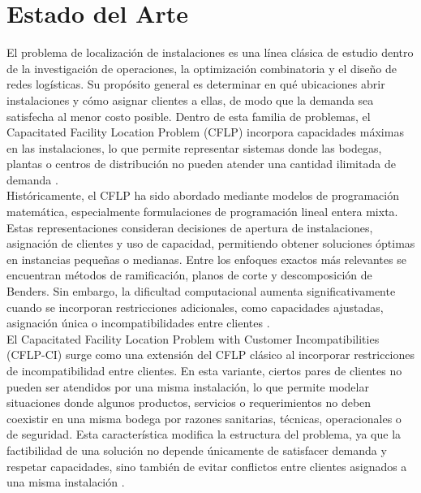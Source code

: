 \section{Estado del Arte}

\noindent El problema de localización de instalaciones es una línea clásica de estudio dentro de la investigación de operaciones, la optimización combinatoria y el diseño de redes logísticas. Su propósito general es determinar en qué ubicaciones abrir instalaciones y cómo asignar clientes a ellas, de modo que la demanda sea satisfecha al menor costo posible. Dentro de esta familia de problemas, el Capacitated Facility Location Problem (CFLP) incorpora capacidades máximas en las instalaciones, lo que permite representar sistemas donde las bodegas, plantas o centros de distribución no pueden atender una cantidad ilimitada de demanda \cite{klose2005facility}.\\

\noindent Históricamente, el CFLP ha sido abordado mediante modelos de programación matemática, especialmente formulaciones de programación lineal entera mixta. Estas representaciones consideran decisiones de apertura de instalaciones, asignación de clientes y uso de capacidad, permitiendo obtener soluciones óptimas en instancias pequeñas o medianas. Entre los enfoques exactos más relevantes se encuentran métodos de ramificación, planos de corte y descomposición de Benders. Sin embargo, la dificultad computacional aumenta significativamente cuando se incorporan restricciones adicionales, como capacidades ajustadas, asignación única o incompatibilidades entre clientes \cite{fischetti2016benders,klose2005facility}.\\

\noindent El Capacitated Facility Location Problem with Customer Incompatibilities (CFLP-CI) surge como una extensión del CFLP clásico al incorporar restricciones de incompatibilidad entre clientes. En esta variante, ciertos pares de clientes no pueden ser atendidos por una misma instalación, lo que permite modelar situaciones donde algunos productos, servicios o requerimientos no deben coexistir en una misma bodega por razones sanitarias, técnicas, operacionales o de seguridad. Esta característica modifica la estructura del problema, ya que la factibilidad de una solución no depende únicamente de satisfacer demanda y respetar capacidades, sino también de evitar conflictos entre clientes asignados a una misma instalación \cite{maia2023metaheuristic,ceschia2024multineighborhood}.\\


